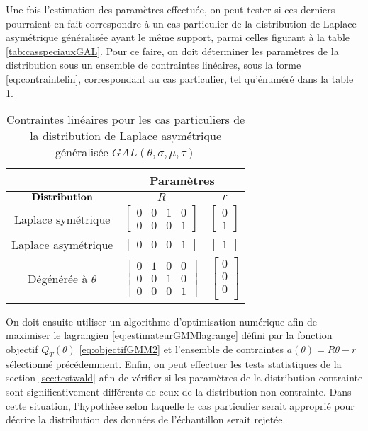 Une fois l'estimation des paramètres effectuée, on peut tester si ces
derniers pourraient en fait correspondre à un cas particulier de la
distribution de Laplace asymétrique généralisée ayant le même support,
parmi celles figurant à la table \ref{tab:casspeciauxGAL}. Pour ce
faire, on doit déterminer les paramètres de la distribution sous un
ensemble de contraintes linéaires, sous la forme
\eqref{eq:contraintelin}, correspondant au cas particulier, tel
qu'énuméré dans la table \ref{tab:contraintesGAL}.
\begin{table}[h!]
  \centering
  \begin{tabular}{ccc}
    & \multicolumn{2}{c}{\textbf{Paramètres}} \\
    \hline
    $\text{\textbf{Distribution}}$ & $R$ & $r$ \\
    \hline
    Laplace symétrique & $\begin{bmatrix}
      0&0&1&0\\
      0&0&0&1
    \end{bmatrix}$ & $\begin{bmatrix}
      0\\
      1
    \end{bmatrix}$  \\[1cm]
    Laplace asymétrique & $\begin{bmatrix} 0&0&0&1
    \end{bmatrix}$ & $\begin{bmatrix} 1
    \end{bmatrix}$  \\[1cm]
    Dégénérée à $\theta$ & $\begin{bmatrix}
      0&1&0&0\\
      0&0&1&0\\
      0&0&0&1
    \end{bmatrix}$ & $\begin{bmatrix}
      0\\
      0\\
      0\\
    \end{bmatrix}$\\\hline
  \end{tabular}
  \caption{Contraintes linéaires pour les cas particuliers de la distribution de Laplace asymétrique généralisée $GAL(\theta,\sigma,\mu,\tau)$}
  \label{tab:contraintesGAL}
\end{table}

On doit ensuite utiliser un algorithme d'optimisation numérique afin
de maximiser le lagrangien \eqref{eq:estimateurGMMlagrange} défini par
la fonction objectif $Q_T(\theta)$ \eqref{eq:objectifGMM2} et
l'ensemble de contraintes $a(\theta) = R\theta-r$ sélectionné
précédemment. Enfin, on peut effectuer les tests statistiques de la
section \ref{sec:testwald} afin de vérifier si les paramètres de la
distribution contrainte sont significativement différents de ceux de
la distribution non contrainte. Dans cette situation, l'hypothèse
selon laquelle le cas particulier serait approprié pour décrire la
distribution des données de l'échantillon serait rejetée.

